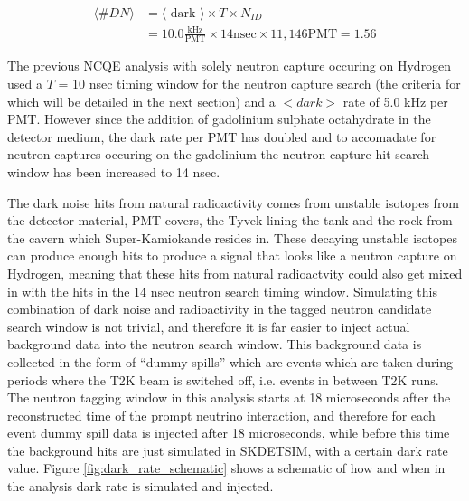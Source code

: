 \begin{equation}
        \begin{aligned}
        \langle \# D N \rangle &=\langle\text { dark }\rangle \times T \times N_{I D} \\
        &=10.0 \frac{\mathrm{kHz}}{\mathrm{PMT}} \times 14 \mathrm{nsec} \times 11,146 \mathrm{PMT}=1.56
        \end{aligned}
        \label{eq:dark_noise_hits} 
\end{equation}

The previous NCQE analysis with solely neutron capture occuring on Hydrogen used a $T$ = 10 nsec timing window for the neutron capture search (the criteria for which will be detailed in the next section) and a $<dark>$ rate of 5.0 kHz per PMT. However since the addition of gadolinium sulphate octahydrate in the detector medium, the dark rate per PMT has doubled and to accomadate for neutron captures occuring on the gadolinium the neutron capture hit search window has been increased to 14 nsec. 

The dark noise hits from natural radioactivity comes from unstable isotopes from the detector material, PMT covers, the Tyvek lining the tank and the rock from the cavern which Super-Kamiokande resides in. These decaying unstable isotopes can produce enough hits to produce a signal that looks like a neutron capture on Hydrogen, meaning that these hits from natural radioactvity could also get mixed in with the hits in the 14 nsec neutron search timing window. Simulating this combination of dark noise and radioactivity in the tagged neutron candidate search window is not trivial, and therefore it is far easier to inject actual background data into the neutron search window. This background data is collected in the form of ``dummy spills'' which are events which are taken during periods where the T2K beam is switched off, i.e. events in between T2K runs. The neutron tagging window in this analysis starts at 18 microseconds after the reconstructed time of the prompt neutrino interaction, and therefore for each event dummy spill data is injected after 18 microseconds, while before this time the background hits are just simulated in SKDETSIM, with a certain dark rate value. Figure \ref{fig:dark_rate_schematic} shows a schematic of how and when in the analysis dark rate is simulated and injected. 


